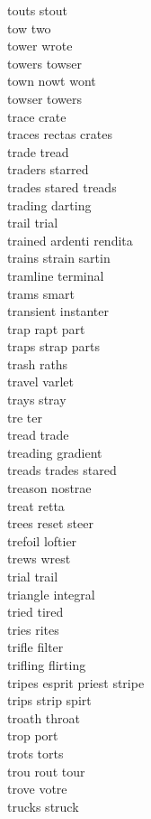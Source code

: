 touts stout\\
tow two\\
tower wrote\\
towers towser\\
town nowt wont\\
towser towers\\
trace crate\\
traces rectas crates\\
trade tread\\
traders starred\\
trades stared treads\\
trading darting\\
trail trial\\
trained ardenti rendita\\
trains strain sartin\\
tramline terminal\\
trams smart\\
transient instanter\\
trap rapt part\\
traps strap parts\\
trash raths\\
travel varlet\\
trays stray\\
tre ter\\
tread trade\\
treading gradient\\
treads trades stared\\
treason nostrae\\
treat retta\\
trees reset steer\\
trefoil loftier\\
trews wrest\\
trial trail\\
triangle integral\\
tried tired\\
tries rites\\
trifle filter\\
trifling flirting\\
tripes esprit priest stripe\\
trips strip spirt\\
troath throat\\
trop port\\
trots torts\\
trou rout tour\\
trove votre\\
trucks struck\\
